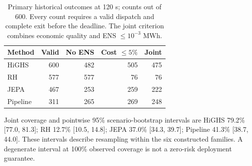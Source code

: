 \begin{table}[htbp]\centering\small
\begin{tabular}{lrrrr}\toprule
Method & Valid & No ENS & Cost $\leq5\%$ & Joint\\\midrule
HiGHS & 600 & 482 & 505 & 475\\
RH & 577 & 577 & 76 & 76\\
JEPA & 467 & 253 & 259 & 222\\
Pipeline & 311 & 265 & 269 & 248\\
\bottomrule\end{tabular}
\caption{Primary historical outcomes at 120 s; counts out of 600. Every count requires a valid dispatch and complete exit before the deadline. The joint criterion combines economic quality and ENS $\leq10^{-3}$ MWh.}\label{tab:coverage}
\end{table}
Joint coverage and pointwise 95\% scenario-bootstrap intervals are HiGHS 79.2\% [77.0, 81.3]; RH 12.7\% [10.5, 14.8]; JEPA 37.0\% [34.3, 39.7]; Pipeline 41.3\% [38.7, 44.0]. These intervals describe resampling within the six constructed families.
A degenerate interval at 100\% observed coverage is not a zero-risk deployment guarantee.
